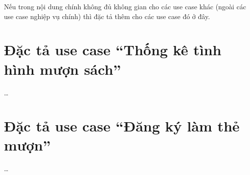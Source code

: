 \documentclass[../LuanVan.tex]{subfiles}
\begin{document}
Nếu trong nội dung chính không đủ không gian cho các use case khác (ngoài các use case nghiệp vụ chính) thì đặc tả thêm cho các use case đó ở đây.

\section{Đặc tả use case ``Thống kê tình hình mượn sách''}
\ldots

\section{Đặc tả use case ``Đăng ký làm thẻ mượn''}
\ldots
\end{document}
